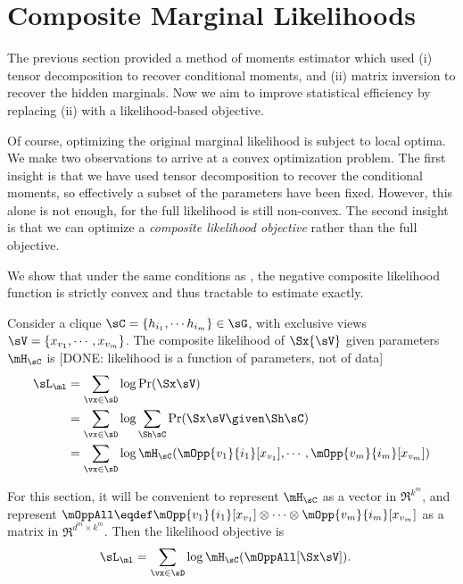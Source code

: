 \section{Composite Marginal Likelihoods}
\label{sec:piecewise}

The previous section provided a method of moments estimator
which used (i) tensor decomposition to recover conditional moments,
and (ii) matrix inversion to recover the hidden marginals.
Now we aim to improve statistical efficiency by replacing (ii) with a likelihood-based objective.

Of course, optimizing the original marginal likelihood is subject to local optima.
We make two observations to arrive at a convex optimization problem.
The first insight is that we have used tensor decomposition to recover the conditional moments,
so effectively a subset of the parameters have been fixed.
However, this alone is not enough, for the full likelihood is still non-convex.
The second insight is that we can optimize a \emph{composite likelihood objective} \cite{lindsay88composite}
rather than the full objective.

We show that under the same conditions as , the
  negative composite likelihood function is strictly convex and thus
  tractable to estimate exactly.

Consider a clique $\sC = \{h_{i_1}, \cdots h_{i_m}\} \in \sG$, with
  exclusive views $\sV = \{x_{v_1}, \cdots, x_{v_m}\}$. 
The composite likelihood of $\Sx{\sV}$ given parameters $\mH_\sC$ is
  [DONE: likelihood is a function of parameters, not of data]
\begin{align*}
  \sL_\ml %
   &= \sum_{\vx \in \sD} \log \Pr( \Sx \sV ) \\
   &= \sum_{\vx \in \sD} \log \sum_{\Sh \sC} \Pr( \Sx \sV \given \Sh \sC ) \\
   &= \sum_{\vx \in \sD} \log \mH_\sC(\mOpp{v_1}{i_1} [x_{v_1}], \cdots, \mOpp{v_m}{i_m} [x_{v_m}])
\end{align*}

For this section, it will be convenient to represent $\mH_\sC$ as
  a vector in $\Re^{k^m}$, and represent $\mOppAll \eqdef
  \mOpp{v_1}{i_1} [x_{v_1}] \otimes \cdots \otimes
  \mOpp{v_m}{i_m} [x_{v_m}]$ as a matrix in $\Re^{d^m \times
  k^m}$.
Then the likelihood objective is
\begin{align*}
  \sL_\ml %
   &= \sum_{\vx \in \sD} \log \mH_\sC(\mOppAll[\Sx\sV]).
\end{align*}

